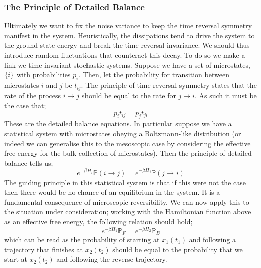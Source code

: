 \subsubsection*{The Principle of Detailed Balance}
Ultimately we want to fix the noise variance to keep the time reversal symmetry manifest in the system. Heuristically, the dissipations tend to drive the system to the ground state energy and break the time reversal invariance. We should thus introduce random fluctuations that counteract this decay. To do so we make a link we time invariant stochastic systems. Suppose we have a set of microstates, $\set{i}$ with probabilities $p_{i}$. Then, let the probability for transition between microstates $i$ and $j$ be $t_{ij}$. The principle of time reversal symmetry states that the rate of the process $i \rightarrow j$ should be equal to the rate for $j \rightarrow i$. As such it must be the case that;
\begin{equation}
p_i t_{ij} = p_j t_{ji}
\end{equation}
These are the detailed balance equations. In particular suppose we have a statistical system with microstates obeying a Boltzmann-like distribution (or indeed we can generalise this to the mesoscopic case by considering the effective free energy for the bulk collection of microstates). Then the principle of detailed balance tells us;
\begin{equation*}
e^{-\beta H_{i}}\mathbb{P}(i \rightarrow j) = e^{-\beta H_{j}} \mathbb{P}(j \rightarrow i)
\end{equation*}
The guiding principle in this statistical system is that if this were not the case then there would be no chance of an equilibrium in the system. It is a fundamental consequence of microscopic reversibility. We can now apply this to the situation under consideration; working with the Hamiltonian function above as an effective free energy, the following relation should hold;
\begin{equation}
\label{eq:detbal}
e^{-\beta H_1} \mathbb{P}_F = e^{-\beta H_2}\mathbb{P}_B
\end{equation} 
which can be read as the probability of starting at $x_1(t_1)$ and following a trajectory that finishes at $x_2(t_2)$ should be equal to the probability that we start at $x_2(t_2)$ and following the reverse trajectory.
